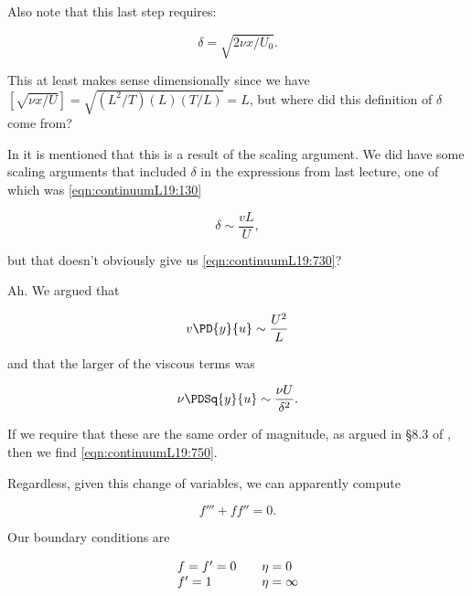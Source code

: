 Also note that this last step requires:

\begin{equation}\label{eqn:continuumL19:730}
\delta = \sqrt{ 2 \nu x/U_0 }.
\end{equation}

This at least makes sense dimensionally since we have $[\sqrt{\nu x/U}] = \sqrt{ (L^2/T) (L) (T/L)} = L$, but where did this definition of $\delta$ come from?

In \cite{ wiki:BlasiusBoundary} it is mentioned that this is a result of the scaling argument.  We did have some scaling arguments that included $\delta$ in the expressions from last lecture, one of which was \ref{eqn:continuumL19:130}

\begin{equation}\label{eqn:continuumL19:750}
\delta \sim \frac{v L}{U},
\end{equation}

but that doesn't obviously give us \ref{eqn:continuumL19:730}?

Ah.  We argued that 

\begin{equation}\label{eqn:continuumL19:1130}
v \PD{y}{u} \sim \frac{U^2}{L}
\end{equation}

and that the larger of the viscous terms was

\begin{equation}\label{eqn:continuumL19:1150}
\nu \PDSq{y}{u} \sim \frac{\nu U}{\delta^2}.
\end{equation}

If we require that these are the same order of magnitude, as argued in \S 8.3 of \cite{acheson1990elementary}, then we find \ref{eqn:continuumL19:750}.

Regardless, given this change of variables, we can apparently compute

\begin{equation}\label{eqn:continuumL19:370}
f''' + f f'' = 0.
\end{equation}

Our boundary conditions are

\begin{equation}\label{eqn:continuumL19:390}
\begin{array}{l l}
f = f' = 0 & \quad \mbox{$\eta = 0$} \\
f' = 1 & \quad \mbox{$\eta = \infty$} \\
\end{array}
\end{equation}

